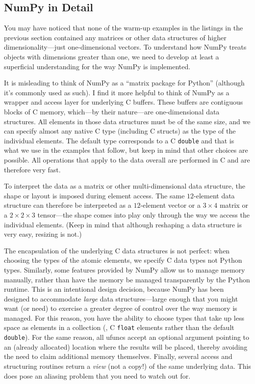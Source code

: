 \vspace*{-6pt}
\subsection{NumPy in Detail}

You may have noticed that none of the warm-up examples in the listings
in the previous section contained any matrices or other data
structures\vadjust{\pagebreak} of higher dimensionality---just one-dimensional vectors.
To understand how NumPy treats objects with dimensions greater than one,
we need to develop at least a superficial understanding for the way
NumPy is implemented.

It is misleading to think of NumPy as a ``matrix package for Python''
(although it's commonly used as such). I find it more helpful to think
of NumPy as a wrapper and access layer for underlying C buffers.
These buffers are contiguous blocks of C memory, which---by their
nature---are one-dimensional data structures. All elements in those
data structures must be of the same size, and we can specify almost
any native C type (including C structs) as the type of the individual
elements. The default type corresponds to a C \texttt{double} and that
is what we use in the examples that follow, but keep in mind that
other choices are possible. All operations that apply to the data
overall are performed in C and are therefore very fast.

To interpret the data as a matrix or other multi-dimensional data
structure, the shape or layout is imposed during element access.  The
same $12$-element data structure can therefore be interpreted as a
$12$-element vector or a $3\times 4$ matrix or a $2 \times 2 \times 3$
tensor---the shape comes into play only through the way we access the
individual elements. (Keep in mind that although reshaping a data
structure is very easy, resizing is not.)

The encapsulation of the underlying C data structures is not perfect:
when choosing the types of the atomic elements, we specify C data
types not Python types. Similarly, some features provided by NumPy
allow us to manage memory manually, rather than have the memory be
managed transparently by the Python runtime. This is an intentional
design decision, because NumPy has been designed to accommodate
\emph{large} data structures---large enough that you might want (or
need) to exercise a greater degree of control over the way memory is
managed. For this reason, you have the ability to choose types that
take up less space as elements in a collection (\eg, C \texttt{float}
elements rather than the default \texttt{double}). For the same
reason, all ufuncs accept an optional argument pointing to an (already
allocated) location where the results will be placed, thereby avoiding
the need to claim additional memory themselves. Finally, several
access and structuring routines return a \emph{view} (not a copy!) of
the same underlying data. This does pose an aliasing problem that you
need to watch out for.

